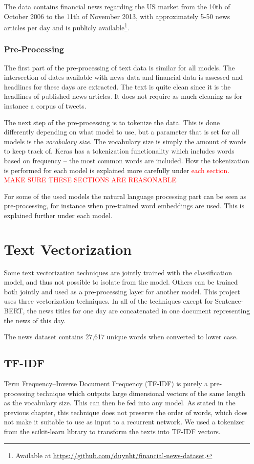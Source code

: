 The data contains financial news regarding the US market from the 10th of October 2006 to the 11th of November 2013, with approximately 5-50 news articles per day and is publicly available\footnote{Available at \url{https://github.com/duynht/financial-news-dataset}.}.

\subsubsection{Pre-Processing}

The first part of the pre-processing of text data is similar for all models. The intersection of dates available with news data and financial data is assessed and headlines for these days are extracted. The text is quite clean since it is the headlines of published news articles. It does not require as much cleaning as for instance a corpus of tweets. 

The next step of the pre-processing is to tokenize the data. This is done differently depending on what model to use, but a parameter that is set for all models is the \textit{vocabulary size}. The vocabulary size is simply the amount of words to keep track of. Keras has a tokenization functionality which includes words based on frequency -- the most common words are included. How the tokenization is performed for each model is explained more carefully under \textcolor{red}{each section. MAKE SURE THESE SECTIONS ARE REASONABLE} 

For some of the used models the natural language processing part can be seen as pre-processing, for instance when pre-trained word embeddings are used. This is explained further under each model.

\section{Text Vectorization}
Some text vectorization techniques are jointly trained with the classification model, and thus not possible to isolate from the model. Others can be trained both jointly and used as a pre-processing layer for another model. This project uses three vectorization techniques. In all of the techniques except for Sentence-BERT, the news titles for one day are concatenated in one document representing the news of this day. 

The news dataset contains 27,617 unique words when converted to lower case. 

\subsection{TF-IDF}
Term Frequency--Inverse Document Frequency (TF-IDF) is purely a pre-processing technique which outputs large dimensional vectors of the same length as the vocabulary size. This can then be fed into any model. As stated in the previous chapter, this technique does not preserve the order of words, which does not make it suitable to use as input to a recurrent network. We used a tokenizer from the scikit-learn library to transform the texts into TF-IDF vectors. 


